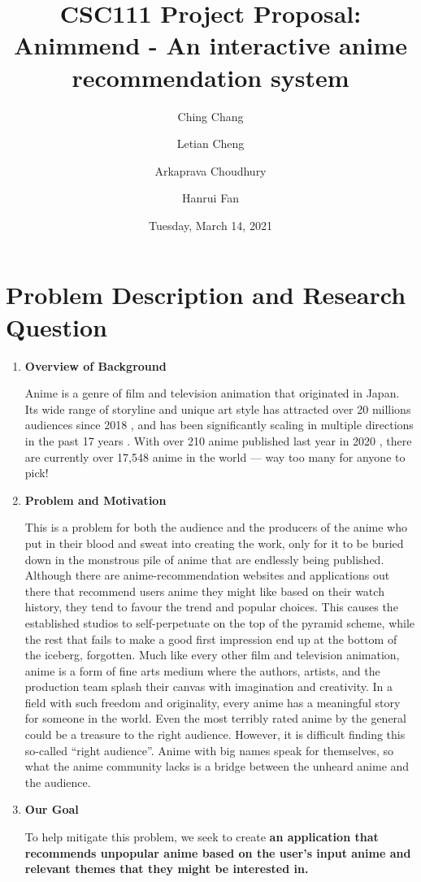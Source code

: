 \documentclass[fontsize=11pt]{article}
\title{CSC111 Project Proposal:\\\textbf{Animmend - An interactive anime recommendation system}}
\author{
  Ching Chang\\
  \and
  Letian Cheng\\
  \and
  Arkaprava Choudhury\\
  \and
  Hanrui Fan
}
\date{Tuesday, March 14, 2021}
\begin{document}
\maketitle

\section*{Problem Description and Research Question}
\begin{enumerate}
    \item \textbf{Overview of Background}
    
    \quad Anime is a genre of film and television animation that originated in Japan. Its wide range of storyline and unique art style has attracted over 20 millions audiences since 2018 \citep{Ani18}, and has been significantly scaling in multiple directions in the past 17 years \citep{Ell18}. With over 210 anime published last year in 2020 \citep{wiki21}, there are currently over 17,548 anime in the world \citep{MyA21} — way too many for anyone to pick!
    
    \item \textbf{Problem and Motivation}
    
    \quad This is a problem for both the audience and the producers of the anime who put in their blood and sweat into creating the work, only for it to be buried down in the monstrous pile of anime that are endlessly being published. Although there are anime-recommendation websites and applications out there that recommend users anime they might like based on their watch history, they tend to favour the trend and popular choices. This causes the established studios to self-perpetuate on the top of the pyramid scheme, while the rest that fails to make a good first impression end up at the bottom of the iceberg, forgotten. Much like every other film and television animation, anime is a form of fine arts medium where the authors, artists, and the production team splash their canvas with imagination and creativity. In a field with such freedom and originality, every anime has a meaningful story for someone in the world. Even the most terribly rated anime by the general could be a treasure to the right audience. However, it is difficult finding this so-called “right audience”. Anime with big names speak for themselves, so what the anime community lacks is a bridge between the unheard anime and the audience.
    
    \item \textbf{Our Goal}
    
    \quad To help mitigate this problem, we seek to create \textbf{an application that recommends unpopular anime based on the user’s input anime and relevant themes that they might be interested in.}
\end{enumerate}
\end{document}
